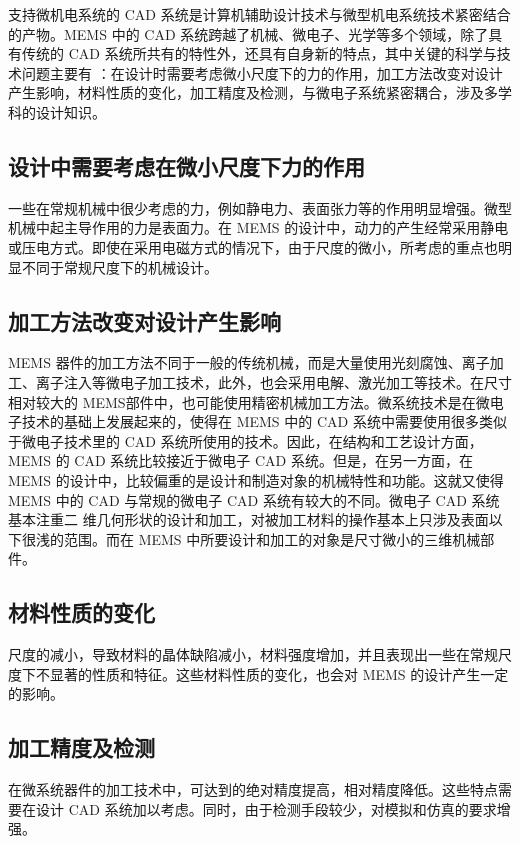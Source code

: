 \documentclass[no-math]{YangThesis}
\begin{document}
支持微机电系统的 CAD 系统是计算机辅助设计技术与微型机电系统技术紧密结合的产物。MEMS 中的 CAD 系统跨越了机械、微电子、光学等多个领域，除了具有传统的 CAD 系统所共有的特性外，还具有自身新的特点，其中关键的科学与技术问题主要有 \cite{bibc59}：在设计时需要考虑微小尺度下的力的作用，加工方法改变对设计产生影响，材料性质的变化，加工精度及检测，与微电子系统紧密耦合，涉及多学科的设计知识。

\subsection{设计中需要考虑在微小尺度下力的作用}

一些在常规机械中很少考虑的力，例如静电力、表面张力等的作用明显增强。微型机械中起主导作用的力是表面力。在 MEMS 的设计中，动力的产生经常采用静电或压电方式。即使在采用电磁方式的情况下，由于尺度的微小，所考虑的重点也明显不同于常规尺度下的机械设计。

\subsection{加工方法改变对设计产生影响}

MEMS 器件的加工方法不同于一般的传统机械，而是大量使用光刻腐蚀、离子加工、离子注入等微电子加工技术，此外，也会采用电解、激光加工等技术。在尺寸相对较大的 MEMS部件中，也可能使用精密机械加工方法。微系统技术是在微电子技术的基础上发展起来的，使得在 MEMS 中的 CAD 系统中需要使用很多类似于微电子技术里的 CAD 系统所使用的技术。因此，在结构和工艺设计方面，MEMS 的 CAD 系统比较接近于微电子 CAD 系统。但是，在另一方面，在 MEMS 的设计中，比较偏重的是设计和制造对象的机械特性和功能。这就又使得 MEMS 中的 CAD 与常规的微电子 CAD 系统有较大的不同。微电子 CAD 系统基本注重二 维几何形状的设计和加工，对被加工材料的操作基本上只涉及表面以下很浅的范围。而在 MEMS 中所要设计和加工的对象是尺寸微小的三维机械部件。

\subsection{材料性质的变化}

尺度的减小，导致材料的晶体缺陷减小，材料强度增加，并且表现出一些在常规尺度下不显著的性质和特征。这些材料性质的变化，也会对 MEMS 的设计产生一定的影响。

\subsection{加工精度及检测}

在微系统器件的加工技术中，可达到的绝对精度提高，相对精度降低。这些特点需要在设计 CAD 系统加以考虑。同时，由于检测手段较少，对模拟和仿真的要求增强。
\end{document}

